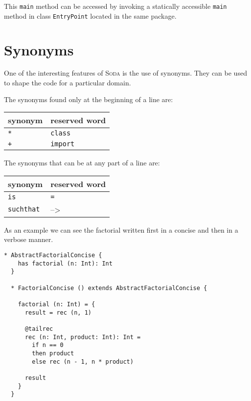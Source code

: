 \documentclass[12pt,a4paper]{book}
\newcommand{\srccode}[1]{\texttt{{#1}}}
\newcommand{\reservedWord}[1]{{\color{blue}\srccode{#1}}\xspace}
\newcommand{\sdef}{\srccode{=}\xspace}
\newcommand{\slambda}{{\tiny--\textgreater}\xspace}
\newcommand{\sclass}{\reservedWord{class}}
\newcommand{\simport}{\reservedWord{import}}
\newcommand{\sasterisk}{\srccode{*}}
\newcommand{\splus}{\srccode{+}}
\newcommand{\sis}{\reservedWord{is}}
\newcommand{\ssuchthat}{\reservedWord{suchthat}}
\newcommand{\Soda}{\textsc{Soda}\xspace}
\begin{document}
    This \srccode{main} method can be accessed by invoking a statically accessible \srccode{main} method in class \srccode{EntryPoint} located in the same package.


    \section{Synonyms}

    One of the interesting features of \Soda is the use of synonyms.
    They can be used to shape the code for a particular domain.

    The synonyms found only at the beginning of a line are:

    \begin{center}
        \begin{tabular}{|ll|}
            \hline
            \textbf{synonym} & \textbf{reserved word} \\
            \hline
            \sasterisk       & \sclass                \\
            \hline
            \splus           & \simport               \\
            \hline
        \end{tabular}
    \end{center}

    The synonyms that can be at any part of a line are:

    \begin{center}
        \begin{tabular}{|ll|}
            \hline
            \textbf{synonym} & \textbf{reserved word} \\
            \hline
            \sis             & \sdef                  \\
            \hline
            \ssuchthat       & \slambda               \\
            \hline
        \end{tabular}
    \end{center}

    As an example we can see the factorial written first in a concise and then in a verbose manner.

    \begin{lstlisting}[label={lst:exampleFactorialConcise}]
  * AbstractFactorialConcise {
    has factorial (n: Int): Int
  }

  * FactorialConcise () extends AbstractFactorialConcise {

    factorial (n: Int) = {
      result = rec (n, 1)

      @tailrec
      rec (n: Int, product: Int): Int =
        if n == 0
        then product
        else rec (n - 1, n * product)

      result
    }
  }
    \end{lstlisting}
\end{document}
